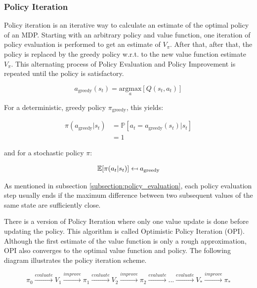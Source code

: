 \subsubsection{Policy Iteration}
\label{sec:PI}
Policy iteration is an iterative way to calculate an estimate of the optimal policy of an MDP. Starting with an arbitrary policy and value function, one iteration of policy evaluation is performed to get an estimate of $V_\pi$. After that, after that, the policy is replaced by the greedy policy w.r.t. to the new value function estimate $V_\pi$. This alternating process of Policy Evaluation and Policy Improvement is repeated until the policy is satisfactory.

\begin{equation}
a_{\text{greedy}}(s_t) = \underset{a}{\text{argmax}}[Q(s_t,a_t)]
\end{equation}

For a deterministic, greedy policy $\pi_{\text{greedy}}$, this yields:

\begin{align}
\pi(a_{\text{greedy}}|s_t)&=\mathbb{P}[a_t=a_{\text{greedy}}(s_t)|s_t] \\ &=1
\end{align}

and for a stochastic policy $\pi$:

\begin{equation}
\mathbb{E}[\pi(a_t | s_t)] \mathrel{\reflectbox{\ensuremath{\mapsto}}} a_{\text{greedy}}
\end{equation}

As mentioned in subsection \ref{subsection:policy_evaluation}, each policy evaluation step usually ends if the maximum difference between two subsequent values of the same state are sufficiently close.

There is a version of Policy Iteration where only one value update is done before updating the policy. This algorithm is called Optimistic Policy Iteration (OPI). Although the first estimate of the value function is only a rough approximation, OPI also converges to the optimal value function and policy. The following diagram illustrates the policy iteration scheme.

\begin{equation*}
\pi_0 \overset{evaluate}{\longrightarrow} V_1 \overset{improve}{\longrightarrow} \pi_1 \overset{evaluate}{\longrightarrow} V_2 \overset{improve}{\longrightarrow} \pi_2 \overset{evaluate}{\longrightarrow} ... \overset{evaluate}{\longrightarrow} V_* \overset{improve}{\longrightarrow} \pi_*
\label{eq:pi_scheme}
\end{equation*}

